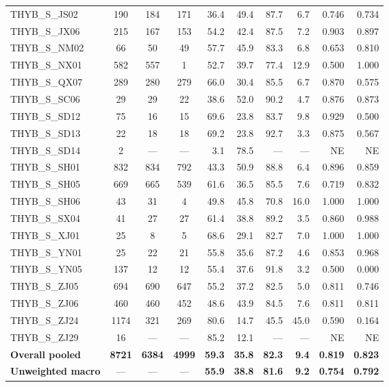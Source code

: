 \begin{responsetable}
\begin{adjustbox}{max width=\textwidth,center}
\begin{tabular}{@{}l *{3}{c} *{6}{r} @{}}
THYB\_S\_JS02 & 190 & 184 & 171 & 36.4 & 49.4 & 87.7 & 6.7 & 0.746 & 0.734 \\
THYB\_S\_JX06 & 215 & 167 & 153 & 54.2 & 42.4 & 87.5 & 7.2 & 0.903 & 0.897 \\
THYB\_S\_NM02 & 66 & 50 & 49 & 57.7 & 45.9 & 83.3 & 6.8 & 0.653 & 0.810 \\
THYB\_S\_NX01 & 582 & 557 & 1 & 52.7 & 39.7 & 77.4 & 12.9 & 0.500 & 1.000 \\
THYB\_S\_QX07 & 289 & 280 & 279 & 66.0 & 30.4 & 85.5 & 6.7 & 0.870 & 0.575 \\
THYB\_S\_SC06 & 29 & 29 & 22 & 38.6 & 52.0 & 90.2 & 4.7 & 0.876 & 0.873 \\
THYB\_S\_SD12 & 75 & 16 & 15 & 69.6 & 23.8 & 83.7 & 9.8 & 0.929 & 0.500 \\
THYB\_S\_SD13 & 22 & 18 & 18 & 69.2 & 23.8 & 92.7 & 3.3 & 0.875 & 0.567 \\
THYB\_S\_SD14 & 2 & --- & --- & 3.1 & 78.5 & --- & --- & NE & NE \\
THYB\_S\_SH01 & 832 & 834 & 792 & 43.3 & 50.9 & 88.8 & 6.4 & 0.896 & 0.859 \\
THYB\_S\_SH05 & 669 & 665 & 539 & 61.6 & 36.5 & 85.5 & 7.6 & 0.719 & 0.832 \\
THYB\_S\_SH06 & 43 & 31 & 4 & 49.8 & 45.8 & 70.8 & 16.0 & 1.000 & 1.000 \\
THYB\_S\_SX04 & 41 & 27 & 27 & 61.4 & 38.8 & 89.2 & 3.5 & 0.860 & 0.988 \\
THYB\_S\_XJ01 & 25 & 8 & 5 & 68.6 & 29.1 & 82.7 & 7.0 & 1.000 & 1.000 \\
THYB\_S\_YN01 & 25 & 22 & 21 & 55.8 & 35.6 & 87.2 & 4.6 & 0.853 & 0.968 \\
THYB\_S\_YN05 & 137 & 12 & 12 & 55.4 & 37.6 & 91.8 & 3.2 & 0.500 & 0.000 \\
THYB\_S\_ZJ05 & 694 & 690 & 647 & 55.2 & 37.2 & 82.5 & 5.0 & 0.811 & 0.746 \\
THYB\_S\_ZJ06 & 460 & 460 & 452 & 48.6 & 43.9 & 84.5 & 7.6 & 0.811 & 0.811 \\
THYB\_S\_ZJ24 & 1174 & 321 & 269 & 80.6 & 14.7 & 45.5 & 45.0 & 0.590 & 0.164 \\
THYB\_S\_ZJ29 & 16 & --- & --- & 85.2 & 12.1 & --- & --- & NE & NE \\
\textbf{Overall pooled} & \textbf{8721} & \textbf{6384} & \textbf{4999} & \textbf{59.3} & \textbf{35.8} & \textbf{82.3} & \textbf{9.4} & \textbf{0.819} & \textbf{0.823} \\
\textbf{Unweighted macro} & --- & --- & --- & \textbf{55.9} & \textbf{38.8} & \textbf{81.6} & \textbf{9.2} & \textbf{0.754} & \textbf{0.792} \\
\bottomrule
\end{tabular}
\end{adjustbox}
\end{responsetable}


